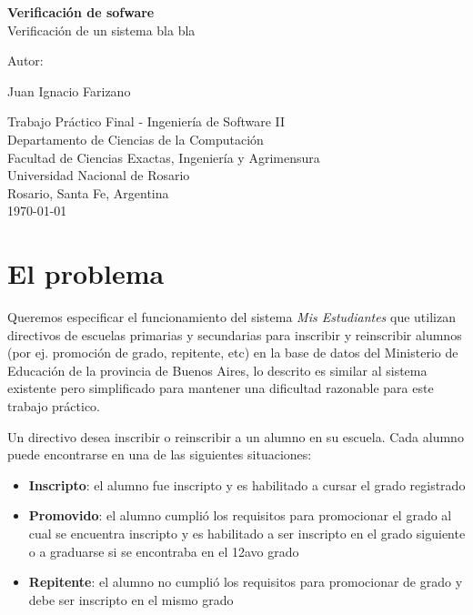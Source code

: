 \documentclass{article}
\begin{document}
\begin{titlepage}
  \thispagestyle{empty}
  \begin{center}
    
    {\huge \textbf{Verificación de sofware} \\[0.4cm]}
    {\large Verificación de un sistema bla bla} \\
    \noindent
    
    \vfill
    \vfill
    \vfill
    {\Large Autor: \par}
    {\Large Juan Ignacio Farizano\par}
  
    \vfill
    Trabajo Práctico Final - Ingeniería de Software II \\
    Departamento de Ciencias de la Computaci\'on\\
    Facultad de Ciencias Exactas, Ingenier\'ia y Agrimensura\\
    Universidad Nacional de Rosario \\
    Rosario, Santa Fe, Argentina\\[0.4cm]
    {\large \today} 
  \end{center}
  \end{titlepage}

\section*{El problema}
Queremos especificar el funcionamiento del sistema \emph{Mis Estudiantes} que utilizan directivos de escuelas primarias y secundarias para inscribir y reinscribir alumnos (por ej. promoción de grado, repitente, etc) en la base de datos del Ministerio de Educación de la provincia de Buenos Aires, lo descrito es similar al sistema existente pero simplificado para mantener una dificultad razonable para este trabajo práctico.


Un directivo desea inscribir o reinscribir a un alumno en su escuela. Cada alumno puede encontrarse en una de las siguientes situaciones:

\begin{itemize}
  \item \textbf{Inscripto}: el alumno fue inscripto y es habilitado a cursar el grado registrado
  \item \textbf{Promovido}: el alumno cumplió los requisitos para promocionar el grado al cual se encuentra inscripto y es habilitado a ser inscripto en el grado siguiente o a graduarse si se encontraba en el 12avo grado
  \item \textbf{Repitente}: el alumno no cumplió los requisitos para promocionar de grado y debe ser inscripto en el mismo grado
\end{itemize}
\end{document}
